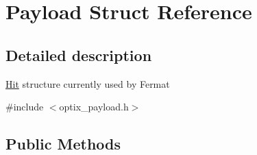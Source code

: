 \hypertarget{struct_payload}{}\section{Payload Struct Reference}
\label{struct_payload}


\subsection{Detailed description}
\hyperlink{struct_hit}{Hit} structure currently used by Fermat 

{\ttfamily \#include $<$optix\+\_\+payload.\+h$>$}

\subsection*{Public Methods}

